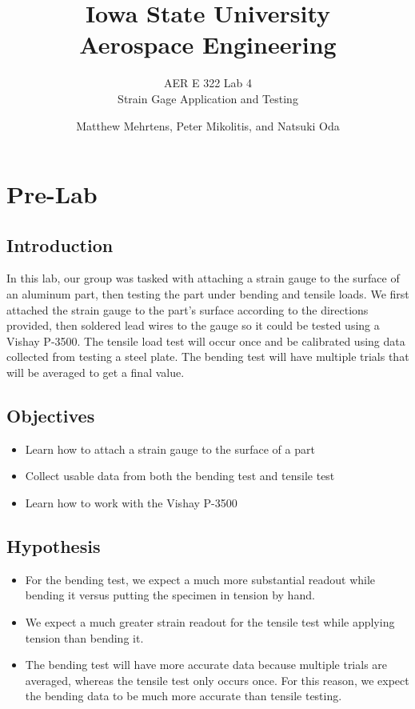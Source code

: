 \documentclass[12 pt]{report}
\title{\textbf{Iowa State University
\\{\Large Aerospace Engineering}}}
\subtitle{AER E 322 Lab 4\\
		  Strain Gage Application and Testing}
\author{Matthew Mehrtens, Peter Mikolitis, and Natsuki Oda}
\begin{document}
\maketitle
\tableofcontents

\chapter{Pre-Lab} \label{ch:pre-lab}
\section{Introduction} \label{sec:introduction}
In this lab, our group was tasked with attaching a strain gauge to the surface of an aluminum part, then testing the part under bending and tensile loads. We first attached the strain gauge to the part's surface according to the directions provided, then soldered lead wires to the gauge so it could be tested using a Vishay P-3500. The tensile load test will occur once and be calibrated using data collected from testing a steel plate. The bending test will have multiple trials that will be averaged to get a final value.

\section{Objectives} \label{sec:objectives}
\begin{itemize}
	\item Learn how to attach a strain gauge to the surface of a part 
	\item Collect usable data from both the bending test and tensile test 
	\item Learn how to work with the Vishay P-3500 
\end{itemize}

\section{Hypothesis} \label{sec:hypothesis}
\begin{itemize}
	\item For the bending test, we expect a much more substantial readout while bending it versus putting the specimen in tension by hand.
	\item We expect a much greater strain readout for the tensile test while applying tension than bending it.
	\item The bending test will have more accurate data because multiple trials are averaged, whereas the tensile test only occurs once. For this reason, we expect the bending data to be much more accurate than tensile testing.
\end{itemize} 
\end{document}
